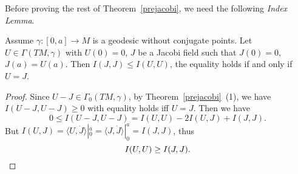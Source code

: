 Before proving the rest of Theorem~\ref{prejacobi}, we need the following \emph{Index Lemma}.

\begin{prop}
    Assume $\gamma:[0,a]\to M$ is a geodesic without conjugate points.
    Let $U\in\Gamma(TM,\gamma)$ with $U(0)=0$, $J$ be a Jacobi field such that $J(0)=0$, $J(a)=U(a)$.
    Then $I(J,J)\leq I(U,U)$, the equality holds if and only if $U=J$.
\end{prop}
\begin{proof}
    Since $U-J\in\Gamma_0(TM,\gamma)$, by Theorem~\ref{prejacobi}~(1), we have $I(U-J,U-J)\geq 0$ with equality holds iff $U=J$.
    Then we have
    \[0\leq I(U-J,U-J)=I(U,U)-2I(U,J)+I(J,J).\]
    But $I(U,J)=\langle U,\dot{J}\rangle|^a_0=\langle J,\dot{J}\rangle|^a_0=I(J,J)$, thus
    \[I(U,U)\geq I(J,J).\qedhere\]
\end{proof}

